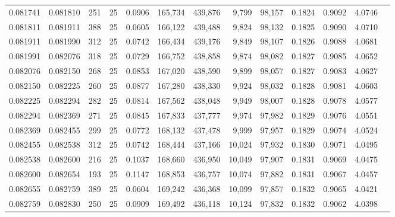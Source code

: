 \begin{tabular}{rrrrrrrrrrrrr}
0.081741 & 0.081810 &   251 &  25 &                                     0.0906 & 165,734 & 439,876 &   9,799 &  98,157 & 0.1824 & 0.9092 & 4.0746 \\
0.081811 & 0.081911 &   388 &  25 &                                     0.0605 & 166,122 & 439,488 &   9,824 &  98,132 & 0.1825 & 0.9090 & 4.0710 \\
0.081911 & 0.081990 &   312 &  25 &                                     0.0742 & 166,434 & 439,176 &   9,849 &  98,107 & 0.1826 & 0.9088 & 4.0681 \\
0.081991 & 0.082076 &   318 &  25 &                                     0.0729 & 166,752 & 438,858 &   9,874 &  98,082 & 0.1827 & 0.9085 & 4.0652 \\
0.082076 & 0.082150 &   268 &  25 &                                     0.0853 & 167,020 & 438,590 &   9,899 &  98,057 & 0.1827 & 0.9083 & 4.0627 \\
0.082150 & 0.082225 &   260 &  25 &                                     0.0877 & 167,280 & 438,330 &   9,924 &  98,032 & 0.1828 & 0.9081 & 4.0603 \\
0.082225 & 0.082294 &   282 &  25 &                                     0.0814 & 167,562 & 438,048 &   9,949 &  98,007 & 0.1828 & 0.9078 & 4.0577 \\
0.082294 & 0.082369 &   271 &  25 &                                     0.0845 & 167,833 & 437,777 &   9,974 &  97,982 & 0.1829 & 0.9076 & 4.0551 \\
0.082369 & 0.082455 &   299 &  25 &                                     0.0772 & 168,132 & 437,478 &   9,999 &  97,957 & 0.1829 & 0.9074 & 4.0524 \\
0.082455 & 0.082538 &   312 &  25 &                                     0.0742 & 168,444 & 437,166 &  10,024 &  97,932 & 0.1830 & 0.9071 & 4.0495 \\
0.082538 & 0.082600 &   216 &  25 &                                     0.1037 & 168,660 & 436,950 &  10,049 &  97,907 & 0.1831 & 0.9069 & 4.0475 \\
0.082600 & 0.082654 &   193 &  25 &                                     0.1147 & 168,853 & 436,757 &  10,074 &  97,882 & 0.1831 & 0.9067 & 4.0457 \\
0.082655 & 0.082759 &   389 &  25 &                                     0.0604 & 169,242 & 436,368 &  10,099 &  97,857 & 0.1832 & 0.9065 & 4.0421 \\
0.082759 & 0.082830 &   250 &  25 &                                     0.0909 & 169,492 & 436,118 &  10,124 &  97,832 & 0.1832 & 0.9062 & 4.0398 \\

\end{tabular}
